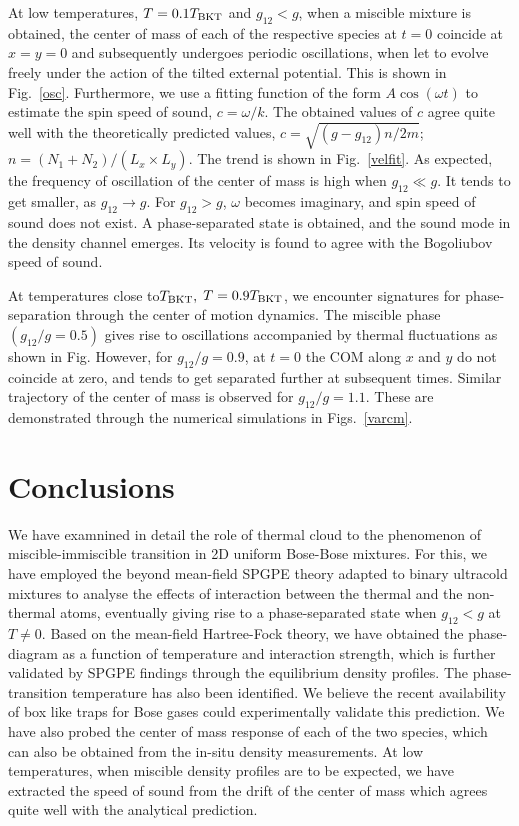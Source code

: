 \documentclass[pra,twocolumn,aps,showpacs,longbibliography]{revtex4-1}
\begin{document}
At low temperatures, $T=0.1T_{\rm BKT}$ and $g_{12}<g$, when a miscible mixture is obtained,
the center of mass of each of the respective species at $t=0$ coincide at $x=y=0$ and subsequently 
undergoes periodic oscillations, when let to
evolve freely under the action of the tilted external potential. This is shown in Fig.~\ref{osc}.
Furthermore, we use a fitting function of the form $A\cos(\omega t)$ to estimate the
spin speed of sound, $c = \omega/k$. The obtained values of $c$ agree quite well with the
theoretically predicted values, $c = \sqrt{(g-g_{12})n/2m}$; $n= (N_1+N_2)/(L_x \times L_y)$.
The trend is shown in Fig.~\ref{velfit}. As expected, the frequency of oscillation of the center of mass is
high when $g_{12}\ll g$. It tends to get smaller, as $g_{12} \rightarrow g$. For $g_{12} >g$,
$\omega$ becomes imaginary, and spin speed of sound does not exist. A phase-separated state
is obtained, and the sound mode in the density channel emerges. Its velocity is found
to agree with the Bogoliubov speed of sound.

At temperatures close to$T_{\rm BKT}, $ $T=0.9T_{\rm BKT}$, we encounter signatures 
for phase-separation through the center of motion dynamics. The miscible phase $(g_{12}/g=0.5)$ 
gives rise to oscillations accompanied by thermal fluctuations as shown in Fig. 
However, for $g_{12}/g=0.9$, at $t=0$ the COM along $x$ and $y$ do not coincide at zero, 
and tends to get separated further at subsequent times. Similar trajectory of the center
of mass is observed for $g_{12}/g=1.1$. These are demonstrated through the numerical
simulations in Figs.~\ref{varcm}.



\section{Conclusions}\label{conclusions}

We have examnined in detail the role of thermal cloud to the phenomenon of
miscible-immiscible transition in 2D uniform Bose-Bose mixtures. For this, we have employed the 
beyond mean-field SPGPE theory adapted to binary ultracold mixtures to analyse the 
effects of interaction between the thermal and the non-thermal atoms, eventually
giving rise to a phase-separated state  when $g_{12}<g$ at $T\neq0$.
Based on the mean-field Hartree-Fock theory, we have obtained
the phase-diagram as a function of temperature and interaction strength, which is 
further validated by SPGPE findings through the equilibrium density profiles. The phase-transition 
temperature has also been identified. We believe the recent availability of box like traps
for Bose gases could experimentally validate this prediction.
We have also probed the center of mass response of each of the two species, which can also 
be obtained from the in-situ density measurements. At low temperatures, when 
miscible density profiles are to be expected, we have extracted the speed of sound from 
the drift of the center of mass which agrees quite well with the analytical prediction. 
\end{document}
